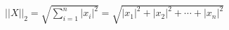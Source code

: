\documentclass[preview]{standalone}
\begin{document}
\begin{align*}
||X||_2 = \sqrt{\sum_{i=1}^{n} |x_i|^2} = \sqrt{|x_1|^2 + |x_2|^2 + \cdots + |x_n|^2}
\end{align*}
\end{document}
